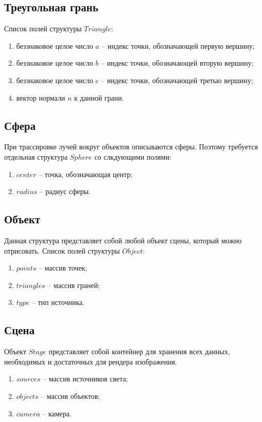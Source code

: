 {    \subsection{Треугольная грань} {
        Список полей структуры $Triangle$:
        \begin{enumerate}
            \item беззнаковое целое число $a$ -- индекс точки, обозначающей первую вершину;
            \item беззнаковое целое число $b$ -- индекс точки, обозначающей вторую вершину;
            \item беззнаковое целое число $c$ -- индекс точки, обозначающей третью вершину;
            \item вектор нормали $n$ к данной грани.
        \end{enumerate}
    }
    \subsection{Сфера} {
        При трассировке лучей вокруг объектов описываются сферы.
        Поэтому требуется отдельная структура $Sphere$ со слкдующими полями:
        \begin{enumerate}
            \item $center$ -- точка, обозначающая центр;
            \item $radius$ -- радиус сферы.
        \end{enumerate}
    }
    \subsection{Объект} {
        Данная структура представляет собой любой объект сцены, который можно отрисовать.
        Список полей структуры $Object$:
        \begin{enumerate}
            \item $points$ -- массив точек;
            \item $triangles$ -- массив граней;
            \item $type$ -- тип источника.
        \end{enumerate}
    }
    \subsection{Сцена} {
        Объект $Stage$ представляет собой контейнер для хранения всех данных,
        необходимых и достаточных для рендера изображения.
        \begin{enumerate}
            \item $sources$ -- массив источников света;
            \item $objects$ -- массив объектов;
            \item $camera$ -- камера.
        \end{enumerate}
    }
}
